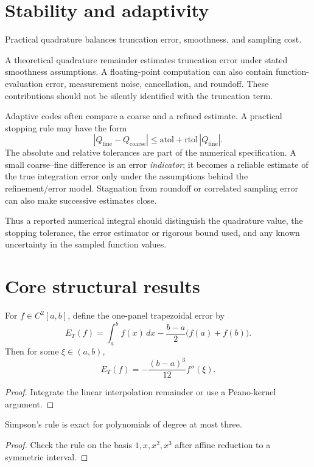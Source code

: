 \section{Stability and adaptivity}
Practical quadrature balances truncation error, smoothness, and sampling cost.

\begin{remark}
A theoretical quadrature remainder estimates truncation error under stated
smoothness assumptions.  A floating-point computation can also contain
function-evaluation error, measurement noise, cancellation, and roundoff.
These contributions should not be silently identified with the truncation
term.

Adaptive codes often compare a coarse and a refined estimate.  A practical
stopping rule may have the form
\[
|Q_{\mathrm{fine}}-Q_{\mathrm{coarse}}|
\le
\mathrm{atol}
+
\mathrm{rtol}\,|Q_{\mathrm{fine}}|.
\]
The absolute and relative tolerances are part of the numerical specification.
A small coarse--fine difference is an error \emph{indicator}; it becomes a
reliable estimate of the true integration error only under the assumptions
behind the refinement/error model.  Stagnation from roundoff or correlated
sampling error can also make successive estimates close.

Thus a reported numerical integral should distinguish the quadrature value,
the stopping tolerance, the error estimator or rigorous bound used, and any
known uncertainty in the sampled function values.
\end{remark}

\section{Core structural results}

\begin{theorem}\label{thm:ii24-01}
For $f\in C^2[a,b]$, define the one-panel trapezoidal error by
\[
E_T(f)=\int_a^b f(x)\,dx-\frac{b-a}{2}\bigl(f(a)+f(b)\bigr).
\]
Then for some $\xi\in(a,b)$,
\[
E_T(f)=-\frac{(b-a)^3}{12}f''(\xi).
\]
\begin{proof}
Integrate the linear interpolation remainder or use a Peano-kernel argument.
\end{proof}
\end{theorem}

\begin{theorem}\label{thm:ii24-02}
Simpson's rule is exact for polynomials of degree at most three.
\begin{proof}
Check the rule on the basis $1,x,x^2,x^3$ after affine reduction to a symmetric interval.
\end{proof}
\end{theorem}

